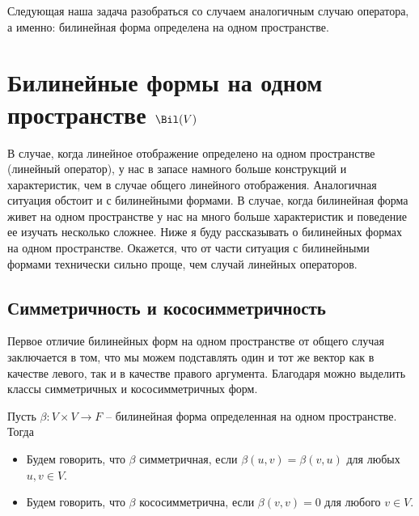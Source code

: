 Следующая наша задача разобраться со случаем аналогичным случаю оператора, а именно: билинейная форма определена на одном пространстве.


\newpage
\section{Билинейные формы на одном пространстве $\Bil(V)$}

В случае, когда линейное отображение определено на одном пространстве (линейный оператор), у нас в запасе намного больше конструкций и характеристик, чем в случае общего линейного отображения.
Аналогичная ситуация обстоит и с билинейными формами.
В случае, когда билинейная форма живет на одном пространстве у нас на много больше характеристик и поведение ее изучать несколько сложнее.
Ниже я буду рассказывать о билинейных формах на одном пространстве.
Окажется, что от части ситуация с билинейными формами технически сильно проще, чем случай линейных операторов.

\subsection{Симметричность и кососимметричность}

Первое отличие билинейных форм на одном пространстве от общего случая заключается в том, что мы можем подставлять один и тот же вектор как в качестве левого, так и в качестве правого аргумента.
Благодаря можно выделить классы симметричных и кососимметричных форм.

\begin{definition}
Пусть $\beta\colon V\times V\to F$ -- билинейная форма определенная на одном пространстве.
Тогда
\begin{itemize}
\item Будем говорить, что $\beta$ симметричная, если $\beta(u,v) = \beta(v,u)$ для любых $u,v\in V$.

\item Будем говорить, что $\beta$ кососимметрична, если $\beta(v,v) = 0$ для любого $v\in V$.
\end{itemize}
\end{definition}

